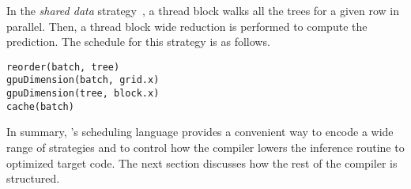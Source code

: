 In the \emph{shared data} strategy~\cite{Tahoe}, a thread block walks all the trees 
for a given row in parallel. 
Then, a thread block wide reduction is performed to compute 
the prediction. The schedule for this strategy is as follows.
\begin{lstlisting}[style=c++]
reorder(batch, tree)
gpuDimension(batch, grid.x)
gpuDimension(tree, block.x)
cache(batch)
\end{lstlisting}
  



In summary, \Treebeard{}'s scheduling language provides a convenient way to
encode a wide range of strategies and to control how the compiler lowers 
the inference routine to optimized target code. The next section 
discusses how the rest of the compiler is structured. 